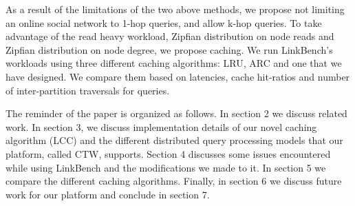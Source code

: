 As a result of the limitations of the two above methods, we propose not limiting
an online social network to 1-hop queries, and allow k-hop queries. To take
advantage of the read heavy workload, Zipfian distribution on node reads and
Zipfian distribution on node degree, we propose caching. We run LinkBench's
workloads using three different caching algorithms: LRU, ARC and one that we
have designed. We compare them based on latencies, cache hit-ratios and number
of inter-partition traversals for queries.

The reminder of the paper is organized as follows. In section 2 we discuss related
work. In section 3, we discuss implementation details of our novel caching algorithm
(LCC) and the different distributed query processing models that our platform, called
CTW, supports. Section 4 discusses some issues encountered while using LinkBench
and the modifications we made to it. In section 5 we compare the different caching
algorithms. Finally, in section 6 we discuss future work for our platform and
conclude in section 7.
